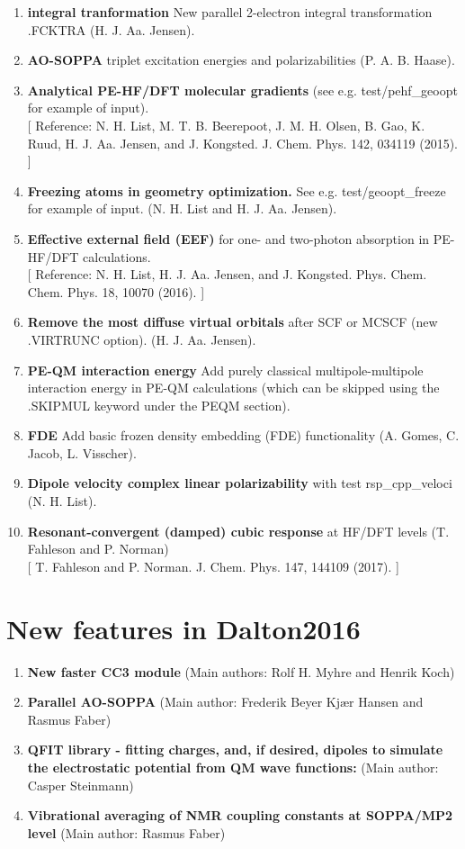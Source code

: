 \begin{enumerate}

\item{\bf integral tranformation} New parallel 2-electron integral transformation .FCKTRA  (H. J. Aa. Jensen).
\item{\bf AO-SOPPA} triplet excitation energies and polarizabilities (P. A. B. Haase).
\item{\bf Analytical PE-HF/DFT molecular gradients} (see e.g. test/pehf\_geoopt for example of input). \\ {}
  [ Reference: N. H. List, M. T. B. Beerepoot, J. M. H. Olsen, B. Gao, K. Ruud, H. J. Aa. Jensen, and J. Kongsted. J. Chem. Phys. 142, 034119 (2015). ]
\item{\bf Freezing atoms in geometry optimization.}
  See e.g. test/geoopt\_freeze for example of input.  (N. H. List and H. J. Aa. Jensen).
\item{\bf Effective external field (EEF)} for one- and two-photon absorption in PE-HF/DFT calculations.\\ {}
  [ Reference: N. H. List, H. J. Aa. Jensen, and J. Kongsted. Phys. Chem. Chem. Phys. 18, 10070 (2016). ]
\item{\bf Remove the most diffuse virtual orbitals} after SCF or MCSCF (new .VIRTRUNC option). (H. J. Aa. Jensen).
\item{\bf PE-QM interaction energy} Add purely classical multipole-multipole interaction energy in PE-QM calculations (which can be skipped using the .SKIPMUL keyword under the \*PEQM section).
\item{\bf FDE} Add basic frozen density embedding (FDE) functionality (A. Gomes, C. Jacob, L. Visscher).
\item{\bf Dipole velocity complex linear polarizability} with test rsp\_cpp\_veloci (N. H. List).
\item{\bf Resonant-convergent (damped) cubic response} at HF/DFT levels (T. Fahleson and P. Norman)\\ {}
  [ T. Fahleson and P. Norman. J. Chem. Phys. 147, 144109 (2017). ]
 
 \end{enumerate}

\section{New features in Dalton2016}

\begin{enumerate}
\item{\bf New faster CC3 module}
(Main authors: Rolf H. Myhre and Henrik Koch)
\item{\bf Parallel AO-SOPPA}
(Main author: Frederik Beyer Kjær Hansen and Rasmus Faber)
\item{\bf QFIT library - fitting charges, and, if desired, dipoles to simulate the electrostatic potential from QM wave functions:}
(Main author: Casper Steinmann)
\item{\bf Vibrational averaging of NMR coupling constants at SOPPA/MP2 level} 
(Main author: Rasmus Faber)
\end{enumerate}

